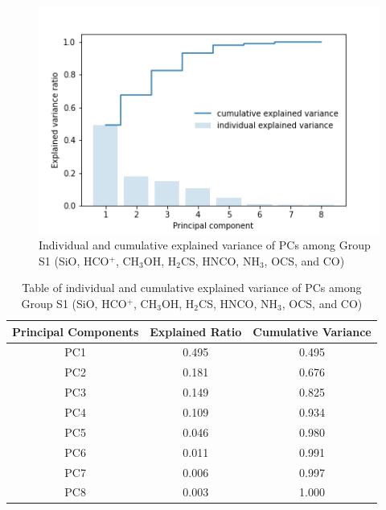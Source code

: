 \documentclass{aa}
\begin{document}
\begin{CJK*}{UTF8}{gbsn}
  \begin{figure}[htbp]
   \centering
   \captionsetup{justification=centering}
   \includegraphics[angle=0,scale =0.6]{shock-1/explained_variance_ratio.png}
   \caption{Individual and cumulative explained variance of PCs among Group S1 (SiO, HCO$^+$, CH$_3$OH, H$_2$CS, HNCO, NH$_3$, OCS, and CO)}
         \label{Fig-shock-1-varianve}
   \end{figure}

\begin{table}[htbp]
\centering
\begin{tabular}{ccc}
\hline\hline
\multicolumn{1}{l}{Principal Components} & \multicolumn{1}{l}{Explained Ratio} & Cumulative Variance \\ \hline
        PC1 & 0.495  & 0.495\\ 
        PC2 & 0.181  & 0.676\\
        PC3 & 0.149  & 0.825\\
        PC4 & 0.109  & 0.934\\ 
        PC5 & 0.046  & 0.980\\
        PC6 & 0.011  & 0.991\\
        PC7 & 0.006  & 0.997\\
        PC8 & 0.003  & 1.000\\\hline\hline
\end{tabular}
\caption{Table of individual and cumulative explained variance of PCs among Group S1 (SiO, HCO$^+$, CH$_3$OH, H$_2$CS, HNCO, NH$_3$, OCS, and CO)}
\label{table-shock-1-1}
\end{table}



\end{CJK*}
\end{document}
